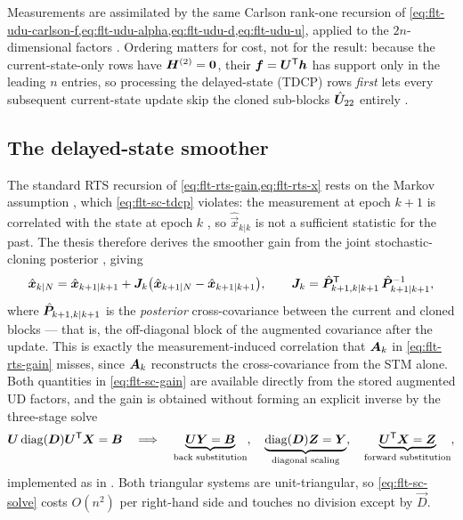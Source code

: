 Measurements are assimilated by the same Carlson rank-one recursion of
\cref{eq:flt-udu-carlson-f,eq:flt-udu-alpha,eq:flt-udu-d,eq:flt-udu-u}, applied
to the $2n$-dimensional factors
\citep[Eqs.~6.24--6.30]{iiyama2026thesis}. Ordering matters for cost, not for
the result: because the current-state-only rows have
$\bm{H}^{(2)} = \bm{0}$, their $\bm{f} = \bm{U}^{\mathsf{T}}\bm{h}$ has
support only in the leading $n$ entries, so processing the delayed-state (TDCP)
rows \emph{first} lets every subsequent current-state update skip the cloned
sub-blocks $\hat{\bm{U}}_{22}$ entirely
\citep[Ch.~6.2.4]{iiyama2026thesis}.

\subsection{The delayed-state smoother}

The standard RTS recursion of \cref{eq:flt-rts-gain,eq:flt-rts-x} rests on the
Markov assumption \citep[Eq.~6.36]{iiyama2026thesis}, which
\cref{eq:flt-sc-tdcp} violates: the measurement at epoch $k+1$ is correlated
with the state at epoch $k$ \citep[Eq.~6.37]{iiyama2026thesis}, so
$\hat{\vec{x}}_{k|k}$ is not a sufficient statistic for the past. The thesis
therefore derives the smoother gain from the joint stochastic-cloning
posterior \citep[Eqs.~6.38--6.41]{iiyama2026thesis}, giving
\begin{equation}
  \label{eq:flt-sc-gain}
  \hat{\bm{x}}_{k|N} = \hat{\bm{x}}_{k+1|k+1}
    + \bm{J}_k\bigl(\hat{\bm{x}}_{k+1|N} - \hat{\bm{x}}_{k+1|k+1}\bigr),
  \qquad
  \bm{J}_k = \hat{\bm{P}}_{k+1,k|k+1}^{\mathsf{T}}\,
              \hat{\bm{P}}_{k+1|k+1}^{-1} ,
\end{equation}
where $\hat{\bm{P}}_{k+1,k|k+1}$ is the \emph{posterior} cross-covariance
between the current and cloned blocks --- that is, the off-diagonal block of
the augmented covariance after the update. This is exactly the
measurement-induced correlation that $\bm{A}_k$ in \cref{eq:flt-rts-gain}
misses, since $\bm{A}_k$ reconstructs the cross-covariance from the STM alone.
Both quantities in \cref{eq:flt-sc-gain} are available directly from the stored
augmented UD factors, and the gain is obtained without forming an explicit
inverse \citep[Eq.~6.42]{iiyama2026thesis} by the three-stage solve
\begin{equation}
  \label{eq:flt-sc-solve}
  \bm{U}\operatorname{diag}(\bm{D})\bm{U}^{\mathsf{T}} \bm{X} = \bm{B}
  \quad\Longrightarrow\quad
  \underbrace{\bm{U}\bm{Y} = \bm{B}}_{\text{back substitution}},
  \quad
  \underbrace{\operatorname{diag}(\bm{D})\bm{Z} = \bm{Y}}_{\text{diagonal scaling}},
  \quad
  \underbrace{\bm{U}^{\mathsf{T}}\bm{X} = \bm{Z}}_{\text{forward substitution}} ,
\end{equation}
implemented as  in
. Both triangular systems are
unit-triangular, so \cref{eq:flt-sc-solve} costs $O(n^2)$ per right-hand side
and touches no division except by $\vec{D}$.

